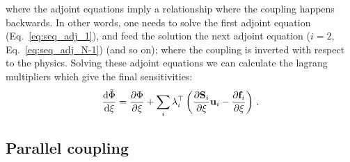 where the adjoint equations imply a relationship where the coupling happens backwards. In other words, one needs to solve the first adjoint equation (Eq.~\eqref{eq:seq_adj_1}), 
and feed the solution the next adjoint equation ($i=2$, Eq.~\eqref{eq:seq_adj_N-1}) (and so on); where the coupling is inverted with respect to the physics. Solving these adjoint equations we can calculate the lagrang
multipliers which give the final sensitivities:
\begin{equation}
    \frac{\mathop{}\!\text{d} \tilde{\Phi}}{\mathop{}\!\text{d} \xi} = \frac{\partial \Phi}{\partial \xi} + \sum_i \lambda_{i}^{\top} \left( \frac{\partial \mathbf{S}_i}{\partial \xi} \mathbf{u}_i - \frac{\partial \mathbf{f}_i}{\partial \xi} \right)\,.
\end{equation}

\subsection{Parallel coupling}

